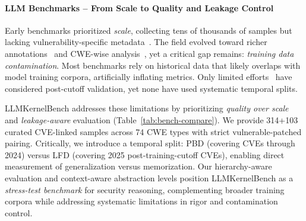 \documentclass[lettersize,journal]{IEEEtran}
\begin{document}
\paragraph*{LLM Benchmarks -- From Scale to Quality and Leakage Control}
Early benchmarks prioritized \emph{scale}, collecting tens of thousands of samples but lacking vulnerability-specific metadata~\cite{lu2021codexglue, zhou2019devign}. The field evolved toward richer annotations~\cite{siddiq2022securityeval, liu2024vuldetectbench, sun2024llm4vuln} and CWE-wise analysis~\cite{khare2025understanding, ullah2024llms}, yet a critical gap remains: \emph{training data contamination}. Most benchmarks rely on historical data that likely overlaps with model training corpora, artificially inflating metrics. Only limited efforts~\cite{ullah2024llms} have considered post-cutoff validation, yet none have used systematic temporal splits.

LLMKernelBench addresses these limitations by prioritizing \emph{quality over scale} and \emph{leakage-aware} evaluation (Table~\ref{tab:bench-compare}). We provide 314+103 curated CVE-linked samples across 74 \gls{CWE} types with strict vulnerable-patched pairing. Critically, we introduce a temporal split: \gls{PBD} (covering CVEs through 2024) versus \gls{LFD} (covering 2025 post-training-cutoff CVEs), enabling direct measurement of generalization versus memorization. Our hierarchy-aware evaluation and context-aware abstraction levels position LLMKernelBench as a \emph{stress-test benchmark} for security reasoning, complementing broader training corpora while addressing systematic limitations in rigor and contamination control.

\begin{table}[!t]
\centering
\caption{VD benchmarks at a glance}
\label{tab:bench-compare}
\small
\setlength{\tabcolsep}{3pt}
\renewcommand{\arraystretch}{1.1}
\end{table}
\end{document}

